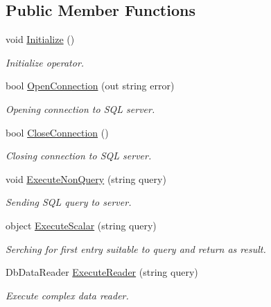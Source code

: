 \subsection*{Public Member Functions}
\begin{DoxyCompactItemize}
\item 
void \mbox{\hyperlink{interface_uniform_data_operator_1_1_sql_1_1_i_sql_operator_a590fa080f8c35ebf5ee6ac535545e2a8}{Initialize}} ()
\begin{DoxyCompactList}\small\item\em Initialize operator. \end{DoxyCompactList}\item 
bool \mbox{\hyperlink{interface_uniform_data_operator_1_1_sql_1_1_i_sql_operator_a6fc9e5efd1e21ae9998b9c56ae9e347c}{Open\+Connection}} (out string error)
\begin{DoxyCompactList}\small\item\em Opening connection to S\+QL server. \end{DoxyCompactList}\item 
bool \mbox{\hyperlink{interface_uniform_data_operator_1_1_sql_1_1_i_sql_operator_a1a6429996e1bbb452f4e034fd634e640}{Close\+Connection}} ()
\begin{DoxyCompactList}\small\item\em Closing connection to S\+QL server. \end{DoxyCompactList}\item 
void \mbox{\hyperlink{interface_uniform_data_operator_1_1_sql_1_1_i_sql_operator_a94a133a152ee1f509bcb049c7175c445}{Execute\+Non\+Query}} (string query)
\begin{DoxyCompactList}\small\item\em Sending S\+QL query to server. \end{DoxyCompactList}\item 
object \mbox{\hyperlink{interface_uniform_data_operator_1_1_sql_1_1_i_sql_operator_a0124a73135270fb2b6eb33077f4dd38f}{Execute\+Scalar}} (string query)
\begin{DoxyCompactList}\small\item\em Serching for first entry suitable to query and return as result. \end{DoxyCompactList}\item 
Db\+Data\+Reader \mbox{\hyperlink{interface_uniform_data_operator_1_1_sql_1_1_i_sql_operator_a1f12179dd2e639b12556e8821b0f7607}{Execute\+Reader}} (string query)
\begin{DoxyCompactList}\small\item\em Execute complex data reader. \end{DoxyCompactList}\item 

\end{DoxyCompactItemize}
